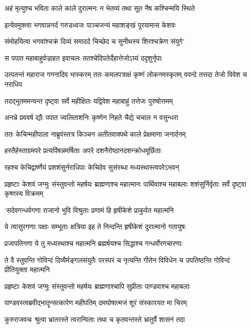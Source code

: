 \twolineshloka
{अहं मृत्युश्च भविता काले काले दुरात्मनः}
{न भेतव्यं तथा सूत नैष कश्चिन्मयि स्थिते}


\twolineshloka
{इत्येवमुक्त्वा भगवान्ननर्द गरुडध्वजः}
{पाञ्चजन्यं महाशङ्खं पूरयामास केशवः}


\twolineshloka
{संमोहयित्वा भगवांश्चक्रं दिव्यं समाददे}
{चिच्छेद च सुनीथस्य शिरश्चक्रेण संयुगे'}


\twolineshloka
{स पपात महाबाहुर्वज्राहत इवाचलः}
{ततश्चेदिपतेर्देहात्तेजोऽग्र्यं ददृशुर्नृपाः}


\threelineshloka
{उत्पतन्तं महाराज गगनादिव भास्करम्}
{ततः कमलपत्राक्षं कृष्णं लोकनमस्कृतम्}
{ववन्दे तत्तदा तेजो विवेश च नराधिप}


\twolineshloka
{तदद्भुतममन्यन्त दृष्ट्वा सर्वे महीक्षितः}
{यद्विवेश महाबाहुं तत्तेजः पुरुषोत्तमम्}


\twolineshloka
{अनभ्रे प्रववर्ष द्यौः पपात ज्वलिताशनिः}
{कृष्णेन निहते चैद्ये चचाल न वसुन्धरा}


\twolineshloka
{ततः केचिन्महीपाला नाब्रुवंस्तत्र किञ्चन}
{अतीतवाक्पथे काले प्रेक्षमाणा जनार्दनम्}


\twolineshloka
{हस्तैर्हस्ताग्रमपरे प्रत्यपिंषन्नमर्षिताः}
{अपरे दशनैरोष्ठानदशन्क्रोधमूर्छिताः}


\twolineshloka
{रहश्च केचिद्वार्ष्णेयं प्रशशंसुर्नराधिपाः}
{केचिदेव सुसंरब्धा मध्यस्थास्त्वपरेऽभवन्}


\threelineshloka
{प्रहृष्टाः केशवं जग्मुः संस्तुवन्तो महर्षयः}
{ब्राह्मणाश्च महात्मानः पार्थिवाश्च महाबलाः}
{शशंसुर्निर्वृताः सर्वे दृष्ट्वा कृष्णस्य विक्रमम्}


\twolineshloka
{`सदेवगन्धर्वगणा राजानो भुवि विश्रुताः}
{प्रणामं हि हृषीकेशे प्राकुर्वत महात्मनि}


\twolineshloka
{ये त्वासुरगणाः पक्षाः सम्भूताः क्षत्रिया इह}
{ते निन्दन्ति हृषीकेशं दुरात्मानो गतायुषः}


\twolineshloka
{प्रजापतिगणा ये तु मध्यस्थाश्च महात्मनि}
{ब्रह्मर्षयश्च सिद्धाश्च गन्धर्वोरगचारणाः}


\threelineshloka
{ते वै स्तुवन्ति गोविन्दं दिव्यैर्मङ्गलसंयुतैः}
{परस्परं च नृत्यन्ति गीतेन विविधेन च}
{उपतिष्ठन्ति गोविन्दं प्रीतियुक्ता महात्मनि}


\twolineshloka
{प्रहृष्टाः केशवं जग्मुः संस्तुवन्तो महर्षयः}
{ब्राह्मणाश्चापि सुप्रीताः पाण्डवाश्च महाबलाः}


\twolineshloka
{पाण्डवस्त्वब्रवीद्भातॄन्सत्कारेण महीपतिम्}
{दमघोषात्मजं शूरं संस्कारयत मा चिरम्}


\twolineshloka
{कुरुराजवचः श्रुत्वा भ्रातरस्ते त्वरान्विताः}
{तथा च कृतवन्तस्ते भ्रातुर्वै शासनं तदा}


